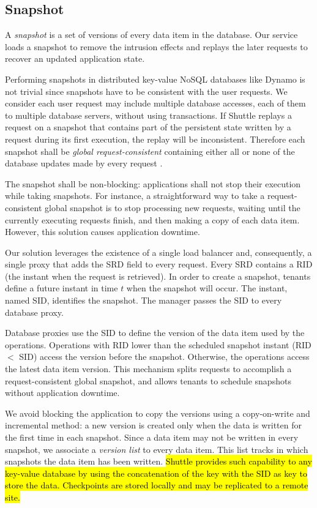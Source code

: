\subsection{Snapshot}
\label{sec:architecture:snapshot}

A \emph{snapshot} is a set of versions of every data item in the database. Our service loads a snapshot to remove the intrusion effects and replays the later requests to recover an updated application state. 

Performing snapshots in distributed key-value NoSQL databases like Dynamo is not trivial since snapshots have to be consistent with the user requests. We consider each user request may include multiple database accesses, each of them to multiple database servers, without using transactions. 
If Shuttle replays a request on a snapshot that contains part of the persistent state written by a request during its first execution, the replay will be inconsistent. Therefore each snapshot shall be \emph{global request-consistent} containing either all or none of the database updates made by every request \cite{checkpoint-survey}. 

The snapshot shall be non-blocking: applications shall not stop their execution while taking snapshots. For instance, a straightforward way to take a request-consistent global snapshot is to stop processing new requests, waiting until the currently executing requests finish, and then making a copy of each data item. However, this solution causes application downtime.

Our solution leverages the existence of a single load balancer and, consequently, a single proxy that adds the \ac{SRD} field to every request. Every \ac{SRD} contains a \ac{RID} (the instant when the request is retrieved). In order to create a snapshot, tenants define a future instant in time $t$ when the snapshot will occur. The instant, named \acf{SID}, identifies the snapshot. The manager passes the \ac{SID} to every database proxy.

Database proxies use the \ac{SID} to define the version of the data item used by the operations. Operations with \acf{RID} lower than the scheduled snapshot instant (\ac{RID} $<$ \ac{SID}) access the version before the snapshot. Otherwise, the operations access the latest data item version. This mechanism splits requests to accomplish a request-consistent global snapshot, and allows tenants to schedule snapshots without application downtime. 

We avoid blocking the application to copy the versions using a copy-on-write and incremental method: a new version is created only when the data is written for the first time in each snapshot. Since a data item may not be written in every snapshot, we associate a \emph{version list} to every data item. This list tracks in which snapshots the data item has been written. \hl{Shuttle provides such capability to any key-value database by using the concatenation of the key with the \ac{SID} as key to store the data. Checkpoints are stored locally and may be replicated to a remote site.}

